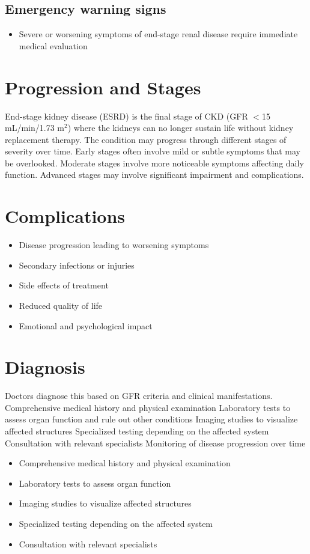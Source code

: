 \subsection{Emergency warning signs}
\begin{itemize}[noitemsep]
  \item Severe or worsening symptoms of end-stage renal disease require immediate medical evaluation
\end{itemize}
\section{Progression and Stages}
End-stage kidney disease (ESRD) is the final stage of CKD (GFR $<$15 mL/min/1.73 m$^2$) where the kidneys can no longer sustain life without kidney replacement therapy. The condition may progress through different stages of severity over time. Early stages often involve mild or subtle symptoms that may be overlooked. Moderate stages involve more noticeable symptoms affecting daily function. Advanced stages may involve significant impairment and complications.
\section{Complications}
\begin{itemize}[noitemsep]
  \item Disease progression leading to worsening symptoms
  \item Secondary infections or injuries
  \item Side effects of treatment
  \item Reduced quality of life
  \item Emotional and psychological impact
\end{itemize}
\section{Diagnosis}
Doctors diagnose this based on GFR criteria and clinical manifestations. Comprehensive medical history and physical examination Laboratory tests to assess organ function and rule out other conditions Imaging studies to visualize affected structures Specialized testing depending on the affected system Consultation with relevant specialists Monitoring of disease progression over time

\begin{itemize}[noitemsep]
  \item Comprehensive medical history and physical examination
  \item Laboratory tests to assess organ function
  \item Imaging studies to visualize affected structures
  \item Specialized testing depending on the affected system
  \item Consultation with relevant specialists
\end{itemize}

